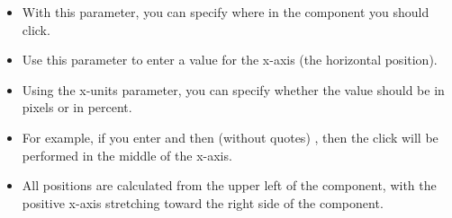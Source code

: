  \begin{itemize}
\item With this parameter, you can specify where in the component you should click.
\item Use this parameter to enter a value for the x-axis (the horizontal position).
\item Using the x-units parameter, you can specify whether the value should be in pixels or in percent. 
\item For example, if you enter  and then  (without quotes) , then the click will be performed in the middle of the x-axis.
\item All positions are calculated from the upper left of the component, with the positive x-axis stretching toward the right side of the component.
\end{itemize}
